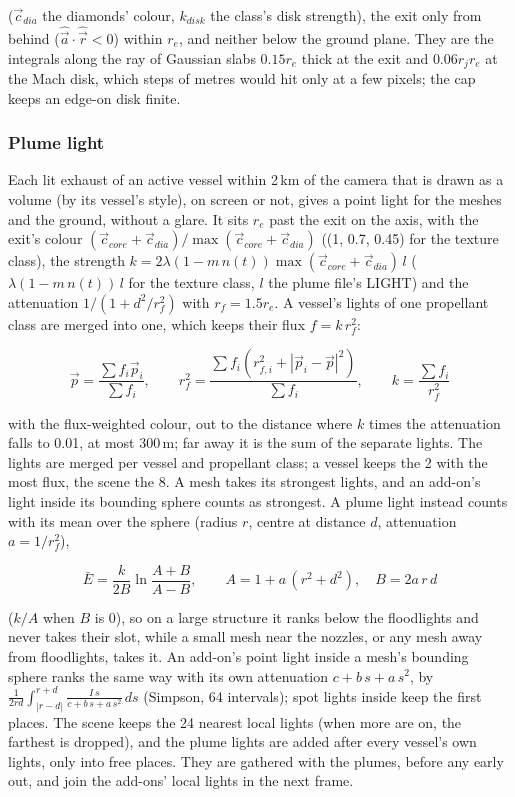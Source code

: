 \documentclass[Orbiter Technical Reference.tex]{subfiles}
\begin{document}
\begin{sloppypar}
\noindent
($\vec{c}_{dia}$ the diamonds' colour, $k_{disk}$ the class's disk strength), the exit only from behind ($\hat{\vec{a}}\cdot\hat{\vec{r}} < 0$) within $r_{e}$, and neither below the ground plane. They are the integrals along the ray of Gaussian slabs $0.15r_{e}$ thick at the exit and $0.06r_{j}r_{e}$ at the Mach disk, which steps of metres would hit only at a few pixels; the cap keeps an edge-on disk finite.

\subsubsection{Plume light}
Each lit exhaust of an active vessel within 2\,km of the camera that is drawn as a volume (by its vessel's style), on screen or not, gives a point light for the meshes and the ground, without a glare. It sits $r_{e}$ past the exit on the axis, with the exit's colour $(\vec{c}_{core} + \vec{c}_{dia})/\max(\vec{c}_{core} + \vec{c}_{dia})$ ((1, 0.7, 0.45) for the texture class), the strength $k = 2\lambda(1 - m\,n(t))\max(\vec{c}_{core} + \vec{c}_{dia})\,l$ ($\lambda(1 - m\,n(t))\,l$ for the texture class, $l$ the plume file's LIGHT) and the attenuation $1/(1 + d^{2}/r_{f}^{2})$ with $r_{f} = 1.5r_{e}$. A vessel's lights of one propellant class are merged into one, which keeps their flux $f = k\,r_{f}^{2}$:

\[ \vec{p} = \frac{\sum f_{i}\vec{p}_{i}}{\sum f_{i}}, \qquad r_{f}^{2} = \frac{\sum f_{i}\left(r_{f,i}^{2} + |\vec{p}_{i} - \vec{p}|^{2}\right)}{\sum f_{i}}, \qquad k = \frac{\sum f_{i}}{r_{f}^{2}} \]

\noindent
with the flux-weighted colour, out to the distance where $k$ times the attenuation falls to 0.01, at most 300\,m; far away it is the sum of the separate lights. The lights are merged per vessel and propellant class; a vessel keeps the 2 with the most flux, the scene the 8. A mesh takes its strongest lights, and an add-on's light inside its bounding sphere counts as strongest. A plume light instead counts with its mean over the sphere (radius $r$, centre at distance $d$, attenuation $a = 1/r_{f}^{2}$),

\[ \bar{E} = \frac{k}{2B}\ln\frac{A + B}{A - B}, \qquad A = 1 + a\,(r^{2} + d^{2}), \quad B = 2a\,r\,d \]

\noindent
($k/A$ when $B$ is 0), so on a large structure it ranks below the floodlights and never takes their slot, while a small mesh near the nozzles, or any mesh away from floodlights, takes it. An add-on's point light inside a mesh's bounding sphere ranks the same way with its own attenuation $c + b\,s + a\,s^{2}$, by $\frac{1}{2rd}\int_{|r-d|}^{r+d} \frac{I\,s}{c + b\,s + a\,s^{2}}\,ds$ (Simpson, 64 intervals); spot lights inside keep the first places. The scene keeps the 24 nearest local lights (when more are on, the farthest is dropped), and the plume lights are added after every vessel's own lights, only into free places. They are gathered with the plumes, before any early out, and join the add-ons' local lights in the next frame.


\end{sloppypar}
\end{document}
